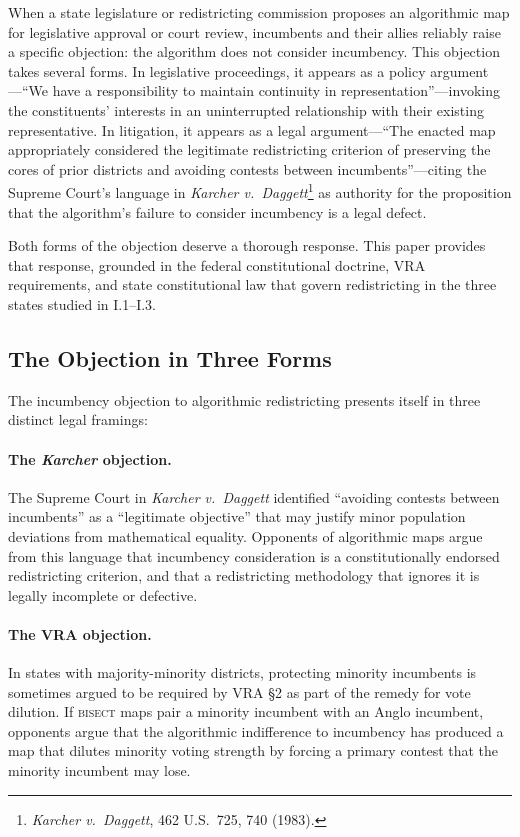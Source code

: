 \label{sec:introduction}

When a state legislature or redistricting commission proposes an algorithmic map for
legislative approval or court review, incumbents and their allies reliably raise a
specific objection: the algorithm does not consider incumbency. This objection takes
several forms. In legislative proceedings, it appears as a policy argument---``We have
a responsibility to maintain continuity in representation''---invoking the constituents'
interests in an uninterrupted relationship with their existing representative. In
litigation, it appears as a legal argument---``The enacted map appropriately considered
the legitimate redistricting criterion of preserving the cores of prior districts and
avoiding contests between incumbents''---citing the Supreme Court's language in
\textit{Karcher v.\ Daggett}\footnote{\textit{Karcher v.\ Daggett}, 462 U.S.\ 725, 740
(1983).} as authority for the proposition that the algorithm's failure to consider
incumbency is a legal defect.

Both forms of the objection deserve a thorough response. This paper provides that
response, grounded in the federal constitutional doctrine, VRA requirements, and state
constitutional law that govern redistricting in the three states studied in I.1--I.3.

\subsection{The Objection in Three Forms}

The incumbency objection to algorithmic redistricting presents itself in three distinct
legal framings:

\paragraph{The \textit{Karcher} objection.}
The Supreme Court in \textit{Karcher v.\ Daggett} identified ``avoiding contests between
incumbents'' as a ``legitimate objective'' that may justify minor population deviations
from mathematical equality. Opponents of algorithmic maps argue from this language that
incumbency consideration is a constitutionally endorsed redistricting criterion, and that
a redistricting methodology that ignores it is legally incomplete or defective.

\paragraph{The VRA objection.}
In states with majority-minority districts, protecting minority incumbents is sometimes
argued to be required by VRA \S{}2 as part of the remedy for vote dilution.
If \textsc{bisect} maps pair a minority incumbent with an Anglo incumbent, opponents
argue that the algorithmic indifference to incumbency has produced a map that dilutes
minority voting strength by forcing a primary contest that the minority incumbent may
lose.

